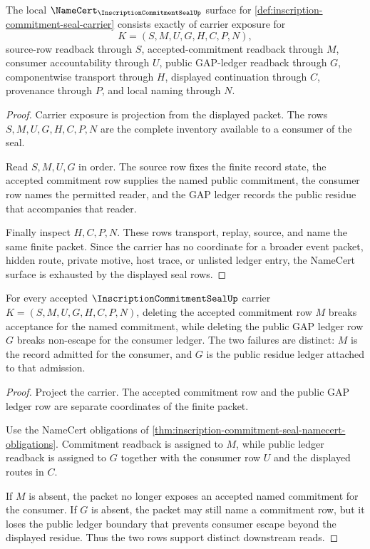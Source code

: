 \begin{theorem}
\label{thm:inscription-commitment-seal-namecert-obligations}
The local $\NameCert_{\InscriptionCommitmentSealUp}$ surface for \autoref{def:inscription-commitment-seal-carrier} consists exactly of carrier exposure for
$$
K=(S,M,U,G,H,C,P,N),
$$
source-row readback through $S$, accepted-commitment readback through $M$, consumer accountability through $U$, public GAP-ledger readback through $G$, componentwise transport through $H$, displayed continuation through $C$, provenance through $P$, and local naming through $N$.
\end{theorem}
\begin{proof}
Carrier exposure is projection from the displayed packet. The rows $S,M,U,G,H,C,P,N$ are the complete inventory available to a consumer of the seal.

Read $S,M,U,G$ in order. The source row fixes the finite record state, the accepted commitment row supplies the named public commitment, the consumer row names the permitted reader, and the GAP ledger records the public residue that accompanies that reader.

Finally inspect $H,C,P,N$. These rows transport, replay, source, and name the same finite packet. Since the carrier has no coordinate for a broader event packet, hidden route, private motive, host trace, or unlisted ledger entry, the NameCert surface is exhausted by the displayed seal rows.
\end{proof}

\begin{theorem}
\label{thm:inscription-commitment-seal-consumer-ledger-split}
For every accepted $\InscriptionCommitmentSealUp$ carrier $K=(S,M,U,G,H,C,P,N)$, deleting the accepted commitment row $M$ breaks acceptance for the named commitment, while deleting the public GAP ledger row $G$ breaks non-escape for the consumer ledger. The two failures are distinct: $M$ is the record admitted for the consumer, and $G$ is the public residue ledger attached to that admission.
\end{theorem}
\begin{proof}
Project the carrier. The accepted commitment row and the public GAP ledger row are separate coordinates of the finite packet.

Use the NameCert obligations of \autoref{thm:inscription-commitment-seal-namecert-obligations}. Commitment readback is assigned to $M$, while public ledger readback is assigned to $G$ together with the consumer row $U$ and the displayed routes in $C$.

If $M$ is absent, the packet no longer exposes an accepted named commitment for the consumer. If $G$ is absent, the packet may still name a commitment row, but it loses the public ledger boundary that prevents consumer escape beyond the displayed residue. Thus the two rows support distinct downstream reads.
\end{proof}

